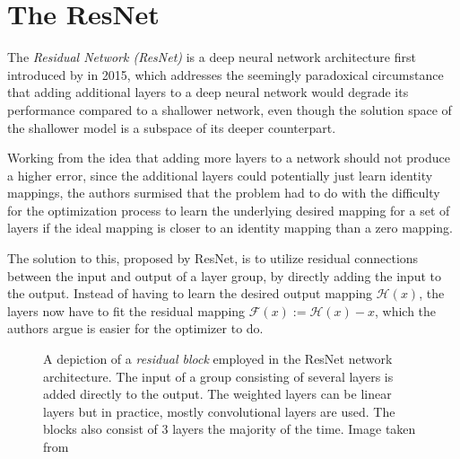 \section{The ResNet}
\label{sec:resnet}

The \emph{Residual Network (ResNet)} is a deep neural network architecture first introduced by \cite{heDeepResidualLearning2015} in 2015, which addresses the seemingly paradoxical circumstance that adding additional layers to a deep neural network would degrade its performance compared to a shallower network, even though the solution space of the shallower model is a subspace of its deeper counterpart. 

Working from the idea that adding more layers to a network should not produce a higher error, since the additional layers could potentially just learn identity mappings, the authors surmised that the problem had to do with the difficulty for the optimization process to learn the underlying desired mapping for a set of layers if the ideal mapping is closer to an identity mapping than a zero mapping.

The solution to this, proposed by ResNet, is to utilize residual connections between the input and output of a layer group, by directly adding the input to the output. 
Instead of having to learn the desired output mapping $\mathcal{H}(x)$, the layers now have to fit the residual mapping $\mathcal{F}(x) := \mathcal{H}(x) - x$, which the authors argue is easier for the optimizer to do.

\begin{figure}[htbp]
    \caption{A depiction of a \emph{residual block} employed in the ResNet network architecture. The input of a group consisting of several layers is added directly to the output. The weighted layers can be linear layers but in practice, mostly convolutional layers are used. The blocks also consist of 3 layers the majority of the time. Image taken from \cite{heDeepResidualLearning2015}}
    \label{fig:resblock}
\end{figure}

